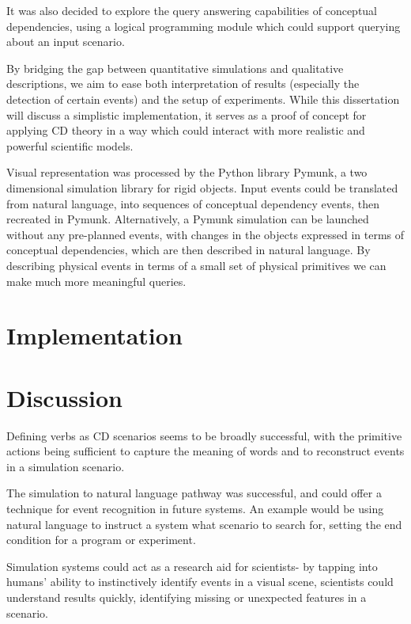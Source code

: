 \documentclass{article}
\begin{document}
    It was also decided to explore the query answering capabilities of conceptual dependencies, using a logical programming module which could support querying about an input scenario.

    By bridging the gap between quantitative simulations and qualitative descriptions, we aim to ease both interpretation of results (especially the detection of certain events) and the setup of experiments. While this dissertation will discuss a simplistic implementation, it serves as a proof of concept for applying CD theory in a way which could interact with more realistic and powerful scientific models.

    Visual representation was processed by the Python library Pymunk, a two dimensional simulation library for rigid objects. Input events could be translated from natural language, into sequences of conceptual dependency events, then recreated in Pymunk. Alternatively, a Pymunk simulation can be launched without any pre-planned events, with changes in the objects expressed in terms of conceptual dependencies, which are then described in natural language. By describing physical events in terms of a small set of physical primitives we can make much more meaningful queries.


    \section{Implementation}
    


    \section{Discussion}
    Defining verbs as CD scenarios seems to be broadly successful, with the primitive actions being sufficient to capture the meaning of words and to reconstruct events in a simulation scenario.

    The simulation to natural language pathway was successful, and could offer a technique for event recognition in future systems. An example would be using natural language to instruct a system what scenario to search for, setting the end condition for a program or experiment.

    Simulation systems could act as a research aid for scientists- by tapping into humans' ability to instinctively identify events in a visual scene, scientists could understand results quickly, identifying missing or unexpected features in a scenario.
\end{document}
